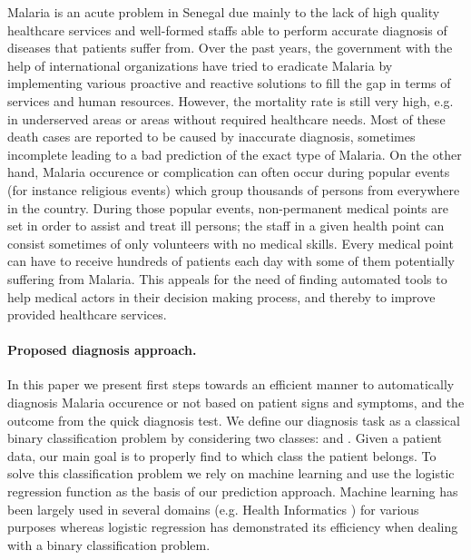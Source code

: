 Malaria is an acute problem in Senegal  due mainly to the lack of high quality healthcare services and well-formed
staffs able to perform accurate diagnosis of diseases that patients suffer from. Over the past years, the government with 
the help of international organizations have tried to eradicate Malaria by implementing various proactive and reactive solutions 
to fill the gap in terms of services and human resources. However, the mortality rate is still very high, e.g. in underserved areas
or areas without required healthcare needs. Most of these death cases are reported to be caused by inaccurate diagnosis, sometimes 
incomplete leading to a bad prediction of the exact type of Malaria.
On the other hand, Malaria occurence or complication can often occur  during  popular events (for instance religious events)
which group thousands of persons from everywhere in the country. During those popular events, non-permanent medical points are set in order
to assist and treat ill persons; the staff in a given health point can consist sometimes of only volunteers with no medical skills. Every medical 
point can have to receive hundreds of patients each day with some of them potentially suffering from Malaria. 
This appeals for the need of finding automated tools to help medical actors in their decision making process, and thereby to improve provided 
healthcare services.   

\paragraph*{Proposed diagnosis approach.}
In this paper we present first steps towards an efficient manner to automatically diagnosis Malaria occurence or not based on patient signs and symptoms,
and the outcome from the quick diagnosis test. We define our diagnosis task as a classical binary classification problem by considering two classes:  and .
Given a patient data, our main goal is to properly find to which class the patient belongs. To solve this classification problem we rely on machine learning and use the logistic regression
function as the basis of our prediction approach. Machine learning has been largely used in several domains (e.g. Health Informatics  \cite{Du13}) for various purposes whereas logistic regression has demonstrated its efficiency when dealing with a binary classification problem. 
 
